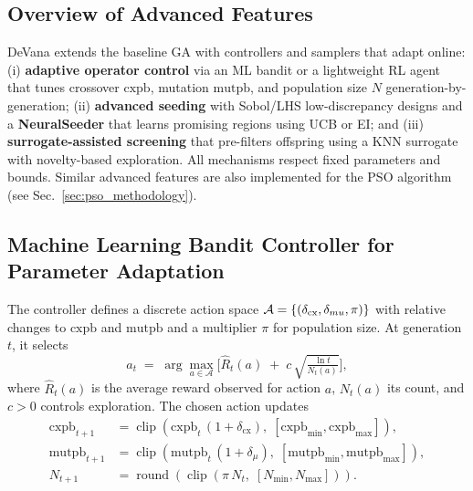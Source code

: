 \documentclass[12pt,a4paper]{article}
\begin{document}
    \subsection{Overview of Advanced Features}
    DeVana extends the baseline GA with controllers and samplers that adapt online: (i) \textbf{adaptive operator control} via an ML bandit or a lightweight RL agent that tunes crossover $\text{cxpb}$, mutation $\text{mutpb}$, and population size $N$ generation-by-generation; (ii) \textbf{advanced seeding} with Sobol/LHS low-discrepancy designs and a \textbf{NeuralSeeder} that learns promising regions using UCB or EI; and (iii) \textbf{surrogate-assisted screening} that pre-filters offspring using a KNN surrogate with novelty-based exploration. All mechanisms respect fixed parameters and bounds. Similar advanced features are also implemented for the PSO algorithm (see Sec.~\ref{sec:pso_methodology}).

    \subsection{Machine Learning Bandit Controller for Parameter Adaptation}
    The controller defines a discrete action space $\mathcal{A}=\{(\delta_{\text{cx}},\delta_{\\mu},\pi)\}$ with relative changes to $\text{cxpb}$ and $\text{mutpb}$ and a multiplier $\pi$ for population size. At generation $t$, it selects
    \begin{equation}
        a_t\;=\;\arg\max_{a\in\mathcal{A}}\Big[ \hat{R}_t(a)\; +\; c\,\sqrt{\tfrac{\ln t}{N_t(a)}} \Big], \label{Eq.ucb}
    \end{equation}
    where $\hat{R}_t(a)$ is the average reward observed for action $a$, $N_t(a)$ its count, and $c>0$ controls exploration. The chosen action updates
    \begin{align}
        \text{cxpb}_{t+1}&=\operatorname{clip}(\text{cxpb}_t\,(1+\delta_{\text{cx}}),\;[\text{cxpb}_{\min},\text{cxpb}_{\max}]),\\
        \text{mutpb}_{t+1}&=\operatorname{clip}(\text{mutpb}_t\,(1+\delta_{\mu}),\;[\text{mutpb}_{\min},\text{mutpb}_{\max}]),\\
        N_{t+1}&=\operatorname{round}(\operatorname{clip}(\pi\,N_t,\;[N_{\min},N_{\max}])).
    \end{align}
\end{document}
